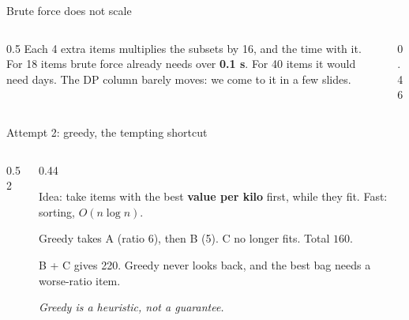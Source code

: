 \documentclass[aspectratio=169,10pt]{beamer}
\begin{document}
\begin{frame}{Brute force does not scale}
\begin{columns}[T]
\begin{column}{0.5\textwidth}
\vspace{2mm}
{\small
Each 4 extra items multiplies the subsets by 16, and the time with it. For 18 items brute force already needs over \textbf{0.1 s}. For 40 items it would need days. The DP column barely moves: we come to it in a few slides.}
\end{column}
\begin{column}{0.46\textwidth}
\begin{sfig}[0.78]
\end{sfig}
\end{column}
\end{columns}
\end{frame}

\begin{frame}{Attempt 2: greedy, the tempting shortcut}
\begin{columns}[T]
\begin{column}{0.52\textwidth}
\end{column}
\begin{column}{0.44\textwidth}
{\small
Idea: take items with the best \textbf{value per kilo} first, while they fit. Fast: sorting, $O(n\log n)$.

\vspace{2mm}
Greedy takes A (ratio 6), then B (5). C no longer fits. Total $160$.}
{\small
\vspace{1mm}
 B + C gives 220. Greedy never looks back, and the best bag needs a worse-ratio item.

\emph{Greedy is a heuristic, not a guarantee.}}
\end{column}
\end{columns}
\end{frame}
\end{document}
